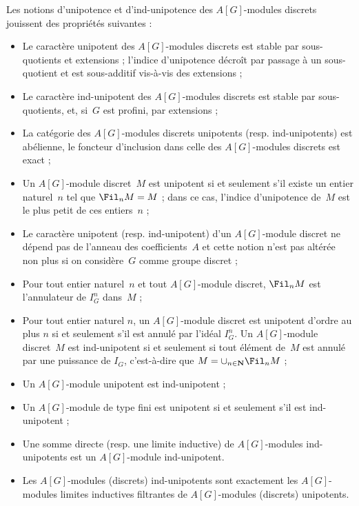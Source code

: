 \documentclass[10pt]{../fichiers-configuration-latex/smfart}
\begin{document}
\begin{proposition2}\label{17-proposition-proprietes-unipotents}
Les notions d'unipotence et d'ind-unipotence des $A[G]$-modules discrets
jouissent des propriétés suivantes :
\begin{itemize}
\item[(i)] Le caractère unipotent des
$A[G]$-modules discrets est stable par sous-quotients
et extensions ; l'indice d'unipotence décroît par passage à un
sous-quotient et est sous-additif vis-à-vis des extensions ;
\item[(ii)] Le caractère ind-unipotent des $A[G]$-modules discrets est
stable par sous-quotients, et, si $G$ est profini, par extensions ;
\item[(iii)] La catégorie des $A[G]$-modules discrets unipotents
(resp. ind-unipotents) est abélienne, le foncteur d'inclusion
dans celle des $A[G]$-modules discrets est exact ;
\item[(iv)] Un $A[G]$-module discret $M$ est
unipotent si et seulement s'il existe un entier naturel $n$ tel que
$\Fil_nM=M$ ; dans ce cas, l'indice d'unipotence de $M$ est le plus petit
de ces entiers $n$ ;
\item[(v)] Le caractère unipotent (resp. ind-unipotent)
d'un $A[G]$-module discret ne dépend pas de l'anneau
des coefficients $A$ et cette notion n'est pas altérée non plus
si on considère $G$ comme groupe discret ;
\item[(vi)] Pour tout entier naturel $n$ et tout $A[G]$-module
discret, $\Fil_n M$ est l'annulateur de $I_G^n$ dans $M$ ;
\item[(vii)] Pour tout entier naturel $n$,
un $A[G]$-module discret est unipotent d'ordre au plus $n$
si et seulement s'il est annulé par l'idéal $I_G^n$. Un $A[G]$-module
discret $M$ est ind-unipotent si et seulement si tout élément de $M$ est
annulé par une puissance de $I_G$, c'est-à-dire que
$M=\cup_{n\in\mathbf{N}}\Fil_n M$ ;
\item[(viii)] Un $A[G]$-module unipotent est ind-unipotent ;
\item[(ix)] Un $A[G]$-module de type fini est unipotent si et seulement
s'il est ind-unipotent ;
\item[(x)] Une somme directe (resp. une limite inductive)
de $A[G]$-modules ind-unipotents est un $A[G]$-module ind-unipotent.
\item[(xi)] Les $A[G]$-modules (discrets) ind-unipotents sont exactement
les $A[G]$-modules limites inductives filtrantes de $A[G]$-modules
(discrets) unipotents.
\end{itemize}
\end{proposition2}
\end{document}
